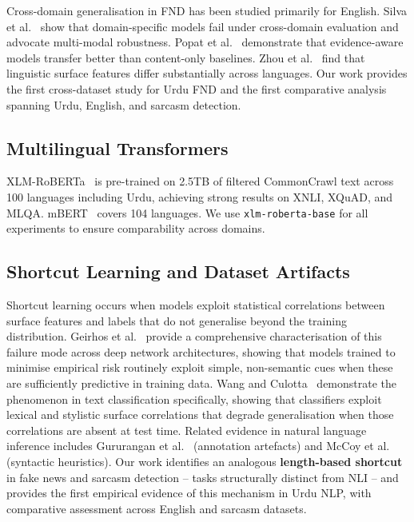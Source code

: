 \documentclass[conference]{IEEEtran}
\begin{document}
Cross-domain generalisation in FND has been studied primarily for
English. Silva et al.~\cite{silva2021embracing} show that
domain-specific models fail under cross-domain evaluation and advocate
multi-modal robustness. Popat et al.~\cite{popat2018declare}
demonstrate that evidence-aware models transfer better than
content-only baselines. Zhou et al.~\cite{zhou2023fake} find that
linguistic surface features differ substantially across languages. Our
work provides the first cross-dataset study for Urdu FND and the first
comparative analysis spanning Urdu, English, and sarcasm detection.

\subsection{Multilingual Transformers}

XLM-RoBERTa~\cite{conneau2020unsupervised} is pre-trained on 2.5TB
of filtered CommonCrawl text across 100 languages including Urdu,
achieving strong results on XNLI, XQuAD, and MLQA.
mBERT~\cite{devlin2018bert} covers 104 languages. We use
\texttt{xlm-roberta-base} for all experiments to ensure comparability
across domains.

\subsection{Shortcut Learning and Dataset Artifacts}

Shortcut learning occurs when models exploit statistical correlations
between surface features and labels that do not generalise beyond the
training distribution. Geirhos et al.~\cite{geirhos2020shortcut}
provide a comprehensive characterisation of this failure mode across
deep network architectures, showing that models trained to minimise
empirical risk routinely exploit simple, non-semantic cues when these
are sufficiently predictive in training data. Wang and
Culotta~\cite{wang2021spurious} demonstrate the phenomenon in text
classification specifically, showing that classifiers exploit lexical
and stylistic surface correlations that degrade generalisation when
those correlations are absent at test time. Related evidence in
natural language inference includes Gururangan et
al.~\cite{gururangan2018annotation} (annotation artefacts) and McCoy
et al.~\cite{mccoy2019right} (syntactic heuristics). Our work
identifies an analogous \textbf{length-based shortcut} in fake news
and sarcasm detection -- tasks structurally distinct from NLI -- and
provides the first empirical evidence of this mechanism in Urdu NLP,
with comparative assessment across English and sarcasm datasets.
\end{document}

